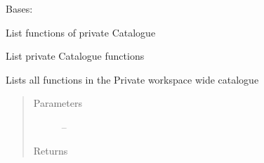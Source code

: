 \documentclass[letterpaper,10pt,english]{sphinxmanual}
\begin{document}
\begin{fulllineitems}
\label{_source/son_editor.apis:son_editor.apis.workspacesapi.PrivateFunctions}
Bases: 

List functions of private Catalogue

\begin{fulllineitems}
\label{_source/son_editor.apis:son_editor.apis.workspacesapi.PrivateFunctions.get}
List private Catalogue functions

Lists all functions in the Private workspace wide catalogue
\begin{quote}\begin{description}
\item[{Parameters}] \leavevmode
{} -- 

\item[{Returns}] \leavevmode


\end{description}\end{quote}

\end{fulllineitems}


\begin{fulllineitems}
\label{_source/son_editor.apis:son_editor.apis.workspacesapi.PrivateFunctions.methods}
\end{fulllineitems}


\end{fulllineitems}

\end{document}
